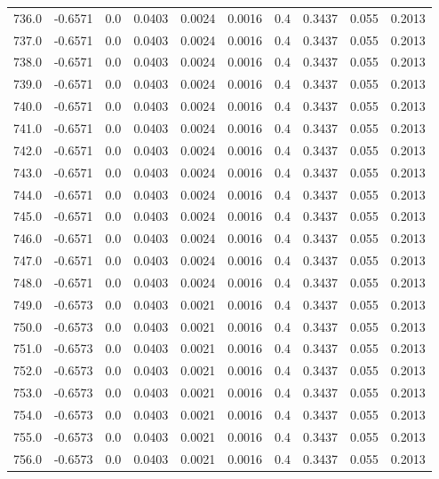 \begin{longtable}{lrrrrrrrrr}
736.0 & -0.6571 & 0.0 & 0.0403 & 0.0024 & 0.0016 & 0.4 & 0.3437 & 0.055 & 0.2013 \\
737.0 & -0.6571 & 0.0 & 0.0403 & 0.0024 & 0.0016 & 0.4 & 0.3437 & 0.055 & 0.2013 \\
738.0 & -0.6571 & 0.0 & 0.0403 & 0.0024 & 0.0016 & 0.4 & 0.3437 & 0.055 & 0.2013 \\
739.0 & -0.6571 & 0.0 & 0.0403 & 0.0024 & 0.0016 & 0.4 & 0.3437 & 0.055 & 0.2013 \\
740.0 & -0.6571 & 0.0 & 0.0403 & 0.0024 & 0.0016 & 0.4 & 0.3437 & 0.055 & 0.2013 \\
741.0 & -0.6571 & 0.0 & 0.0403 & 0.0024 & 0.0016 & 0.4 & 0.3437 & 0.055 & 0.2013 \\
742.0 & -0.6571 & 0.0 & 0.0403 & 0.0024 & 0.0016 & 0.4 & 0.3437 & 0.055 & 0.2013 \\
743.0 & -0.6571 & 0.0 & 0.0403 & 0.0024 & 0.0016 & 0.4 & 0.3437 & 0.055 & 0.2013 \\
744.0 & -0.6571 & 0.0 & 0.0403 & 0.0024 & 0.0016 & 0.4 & 0.3437 & 0.055 & 0.2013 \\
745.0 & -0.6571 & 0.0 & 0.0403 & 0.0024 & 0.0016 & 0.4 & 0.3437 & 0.055 & 0.2013 \\
746.0 & -0.6571 & 0.0 & 0.0403 & 0.0024 & 0.0016 & 0.4 & 0.3437 & 0.055 & 0.2013 \\
747.0 & -0.6571 & 0.0 & 0.0403 & 0.0024 & 0.0016 & 0.4 & 0.3437 & 0.055 & 0.2013 \\
748.0 & -0.6571 & 0.0 & 0.0403 & 0.0024 & 0.0016 & 0.4 & 0.3437 & 0.055 & 0.2013 \\
749.0 & -0.6573 & 0.0 & 0.0403 & 0.0021 & 0.0016 & 0.4 & 0.3437 & 0.055 & 0.2013 \\
750.0 & -0.6573 & 0.0 & 0.0403 & 0.0021 & 0.0016 & 0.4 & 0.3437 & 0.055 & 0.2013 \\
751.0 & -0.6573 & 0.0 & 0.0403 & 0.0021 & 0.0016 & 0.4 & 0.3437 & 0.055 & 0.2013 \\
752.0 & -0.6573 & 0.0 & 0.0403 & 0.0021 & 0.0016 & 0.4 & 0.3437 & 0.055 & 0.2013 \\
753.0 & -0.6573 & 0.0 & 0.0403 & 0.0021 & 0.0016 & 0.4 & 0.3437 & 0.055 & 0.2013 \\
754.0 & -0.6573 & 0.0 & 0.0403 & 0.0021 & 0.0016 & 0.4 & 0.3437 & 0.055 & 0.2013 \\
755.0 & -0.6573 & 0.0 & 0.0403 & 0.0021 & 0.0016 & 0.4 & 0.3437 & 0.055 & 0.2013 \\
756.0 & -0.6573 & 0.0 & 0.0403 & 0.0021 & 0.0016 & 0.4 & 0.3437 & 0.055 & 0.2013 \\

\end{longtable}
